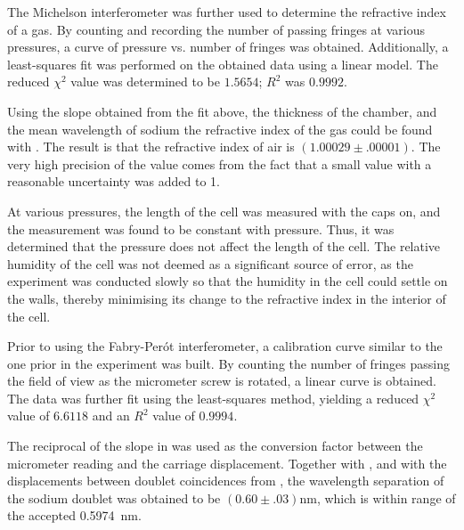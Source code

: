 \begin{paper}
	The Michelson interferometer was further used to determine the refractive index of a gas. By counting and recording the number of passing fringes at various pressures, a curve of pressure vs. number of fringes was obtained. Additionally, a least-squares fit was performed on the obtained data using a linear model. The reduced \( \chi ^ 2 \) value was determined to be \( 1.5654 \); \( R ^ 2 \) was \( 0.9992 \).
	
	
	Using the slope obtained from the fit above, the thickness of the chamber, and the mean wavelength of sodium the refractive index of the gas could be found with \eqGasRefractiveIndex. The result is that the refractive index of air is $(1.00029\pm.00001)$. The very high precision of the value comes from the fact that a small value with a reasonable uncertainty was added to 1.
	
	At various pressures, the length of the cell was measured with the caps on, and the measurement was found to be constant with pressure. Thus, it was determined that the pressure does not affect the length of the cell. The relative humidity of the cell was not deemed as a significant source of error, as the experiment was conducted slowly so that the humidity in the cell could settle on the walls, thereby minimising its change to the refractive index in the interior of the cell.
	
	Prior to using the Fabry-Per\'ot interferometer, a calibration curve similar to the one prior in the experiment was built. By counting the number of fringes passing the field of view as the micrometer screw is rotated, a linear curve is obtained. The data was further fit using the least-squares method, yielding a reduced \( \chi ^ 2  \) value of \( 6.6118 \) and an \( R ^ 2 \) value of \( 0.9994 \).
	
	
	The reciprocal of the slope in \figFabryPerotCalibration was used as the conversion factor between the micrometer reading and the carriage displacement. Together with \eqDoublet, and with the displacements between doublet coincidences from \figDoublet, the wavelength separation of the sodium doublet was obtained to be $(0.60\pm.03)\si{\nano\meter}$, which is within range of the accepted \SI{0.5974}{\nano\meter}.
	

\end{paper}
